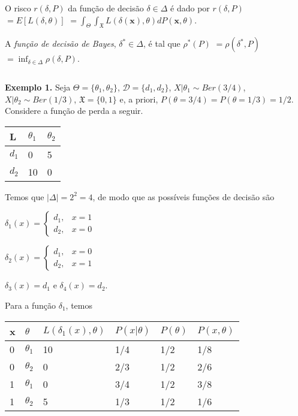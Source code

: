 \documentclass[
]{book}
\begin{document}
O risco \(r(\delta,P)\) da função de decisão \(\delta \in \Delta\) é dado por \(r(\delta,P)\) \(=E\left[L\left(\delta,\theta\right)\right]\) \(=\displaystyle \int_\Theta \int_{\mathfrak{X}} L\left(\delta(\boldsymbol x),\theta\right) dP(\boldsymbol x,\theta)\).

A \emph{função de decisão de Bayes}, \({\delta}^* \in \Delta\), é tal que \({\rho}^*(P)\) \(=\rho({\delta}^*,P)\) \(=\displaystyle \inf_{\delta\in \Delta} \rho(\delta,P)\).

\(~\)

\textbf{Exemplo 1.} Seja \(\Theta=\{\theta_1,\theta_2\}\), \(\mathcal{D}=\{d_1,d_2\}\), \(X|\theta_1\sim Ber(3/4)\), \(X|\theta_2 \sim Ber(1/3)\), \(\mathfrak{X}=\{0,1\}\) e, a priori, \(P(\theta=3/4)=P(\theta=1/3)=1/2\). Considere a função de perda a seguir.

\begin{longtable}[]{@{}lll@{}}
\toprule
L & \(\theta_1\) & \(\theta_2\) \\
\midrule
\endhead
\(d_1\) & 0 & 5 \\
\(d_2\) & 10 & 0 \\
\bottomrule
\end{longtable}

Temos que \(|\Delta| = 2^2=4\), de modo que as possíveis funções de decisão são

\(\delta_1(x)=\left\{\begin{array}{lr} d_1, & x=1\\ d_2, &x=0\end{array}\right.\)

\(\delta_2(x)=\left\{\begin{array}{lr} d_1, & x=0\\ d_2, &x=1\end{array}\right.\)

\(\delta_3(x)=d_1\) e \(\delta_4(x)=d_2\).

Para a função \(\delta_1\), temos

\begin{longtable}[]{@{}llllll@{}}
\toprule
x & \(\theta\) & \(L(\delta_1(x),\theta)\) & \(P(x|\theta)\) & \(P(\theta)\) & \(P(x,\theta)\) \\
\midrule
\endhead
0 & \(\theta_1\) & 10 & 1/4 & 1/2 & 1/8 \\
0 & \(\theta_2\) & 0 & 2/3 & 1/2 & 2/6 \\
1 & \(\theta_1\) & 0 & 3/4 & 1/2 & 3/8 \\
1 & \(\theta_2\) & 5 & 1/3 & 1/2 & 1/6 \\
\bottomrule
\end{longtable}
\end{document}
